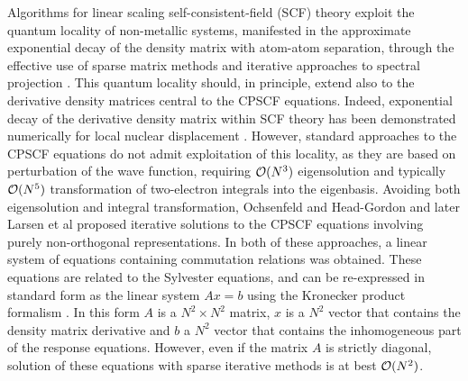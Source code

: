 \documentclass[prl,aps,twocolumn,showpacs,twocolumngrid,superbib]{revtex4}
\begin{document}
Algorithms for linear scaling self-consistent-field (SCF) theory exploit the quantum locality
of non-metallic systems, manifested in the approximate exponential decay of the density matrix 
with atom-atom separation, through the effective use of sparse matrix methods and iterative 
approaches to spectral projection \cite{ANiklasson02}.   This quantum locality should, in principle,
extend also to the derivative density matrices central to the CPSCF equations.  Indeed,  
exponential decay of the derivative density matrix within SCF theory has been demonstrated numerically
for local nuclear displacement \cite{Ochsenfeld_1997}. However, standard approaches to the CPSCF equations 
\cite{Pople_1979,Sekino_1986,Dupuis_1991} do not admit exploitation of this locality, as they are based 
on perturbation of the wave function, requiring ${\cal O}(N^3)$ eigensolution and typically ${\cal O}(N^5)$ 
transformation of two-electron integrals into the eigenbasis.   Avoiding both 
eigensolution and integral transformation,  Ochsenfeld and Head-Gordon \cite{Ochsenfeld_1997} and
later Larsen et al \cite{Helgaker_2001} proposed iterative solutions to the CPSCF equations 
involving purely non-orthogonal representations.   In both of these approaches, a 
linear system of equations containing commutation relations  was obtained.  These equations
are related to the Sylvester equations, and can be re-expressed in standard form 
as the linear system $Ax=b$ using the Kronecker product formalism \cite{}.  In this form 
$A$ is a $N^2\times N^2$ matrix, $x$ is a $N^2$ vector that contains the 
density matrix derivative and $b$ a $N^2$ vector that contains the inhomogeneous
part of the response equations. However, even if the matrix $A$ is strictly diagonal, 
solution of these equations with sparse iterative methods is at best ${\cal O}(N^2)$. 
\end{document}
